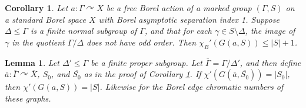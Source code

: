 \documentclass[10pt,a4paper]{amsart}
\newtheorem{lemma}{Lemma}
\newtheorem{corollary}{Corollary}
\begin{document}
\begin{corollary}\label{cor:d+1}
Let $a:\Gamma \curvearrowright X$ be a free Borel action of a marked group $(\Gamma,S)$ on a standard Borel space $X$ with Borel asymptotic separation index 1. Suppose $\Delta \leq \Gamma$ is a finite normal subgroup of $\Gamma$, and that for each $\gamma \in S \setminus \Delta$, the image of $\gamma$ in the quotient $\Gamma/\Delta$ does not have odd order. Then $\chi_B'(G(a,S)) \leq |S|+1$.
\end{corollary}

\begin{lemma}\label{lem:quotient}
Let $\Delta' \leq \Gamma$ be a finite proper subgroup. Let $\overline{\Gamma} = \Gamma/\Delta'$, and then define $\overline{a}:\overline{\Gamma} \curvearrowright \overline{X}$, $S_0$, and $\overline{S_0}$ as in the proof of Corollary \ref{cor:d+1}. If $\chi'(G(\overline{a},\overline{S_0})) = |{S_0}|$, then $\chi'(G(a,S)) = |S|$. Likewise for the Borel edge chromatic numbers of these graphs.
\end{lemma}
\end{document}
